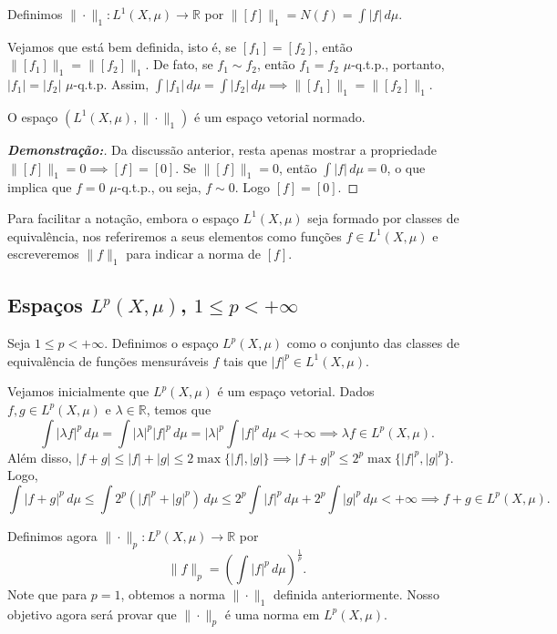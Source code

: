 Definimos $\|\cdot\|_1: L^1(X, \mu) \rightarrow \mathbb{R}$ por $\|[f]\|_1 = N(f) = \int |f| \, d\mu$.

Vejamos que está bem definida, isto é, se $[f_1] = [f_2]$, então $\|[f_1]\|_1 = \|[f_2]\|_1$.
De fato, se $f_1 \sim f_2$, então $f_1 = f_2$ $\mu$-q.t.p., portanto, $|f_1| = |f_2|$ $\mu$-q.t.p. Assim, $\int |f_1| \, d\mu = \int |f_2| \, d\mu \implies \|[f_1]\|_1 = \|[f_2]\|_1$.

\begin{theorem*}{}
O espaço $(L^1(X, \mu), \|\cdot\|_1)$ é um espaço vetorial normado.
\end{theorem*}

\begin{proof}[\textbf{Demonstração:}]
Da discussão anterior, resta apenas mostrar a propriedade $\|[f]\|_1 = 0 \implies [f] = [0]$. 
Se $\|[f]\|_1 = 0$, então $\int |f| \, d\mu = 0$, o que implica que $f=0$ $\mu$-q.t.p., ou seja, $f \sim 0$. Logo $[f] = [0]$.
\end{proof}

Para facilitar a notação, embora o espaço $L^1(X, \mu)$ seja formado por classes de equivalência, nos referiremos a seus elementos como funções $f \in L^1(X, \mu)$ e escreveremos $\|f\|_1$ para indicar a norma de $[f]$.

\subsection*{Espaços $L^p(X, \mu)$, $1 \le p < +\infty$}

\begin{definition*}{}
Seja $1 \le p < +\infty$. Definimos o espaço $L^p(X, \mu)$ como o conjunto das classes de equivalência de funções mensuráveis $f$ tais que $|f|^p \in L^1(X, \mu)$.
\end{definition*}

Vejamos inicialmente que $L^p(X, \mu)$ é um espaço vetorial. Dados $f, g \in L^p(X, \mu)$ e $\lambda \in \mathbb{R}$, temos que
$$ \int |\lambda f|^p \, d\mu = \int |\lambda|^p |f|^p \, d\mu = |\lambda|^p \int |f|^p \, d\mu < +\infty \implies \lambda f \in L^p(X, \mu). $$
Além disso, $|f+g| \le |f| + |g| \le 2 \max\{|f|, |g|\} \implies |f+g|^p \le 2^p \max\{|f|^p, |g|^p\}$.
Logo,
$$ \int |f+g|^p \, d\mu \le \int 2^p(|f|^p + |g|^p) \, d\mu \le 2^p \int |f|^p \, d\mu + 2^p \int |g|^p \, d\mu < +\infty \implies f+g \in L^p(X, \mu). $$

Definimos agora $\|\cdot\|_p: L^p(X, \mu) \rightarrow \mathbb{R}$ por
$$ \|f\|_p = \left( \int |f|^p \, d\mu \right)^{\frac{1}{p}}. $$
Note que para $p=1$, obtemos a norma $\|\cdot\|_1$ definida anteriormente. Nosso objetivo agora será provar que $\|\cdot\|_p$ é uma norma em $L^p(X, \mu)$.

